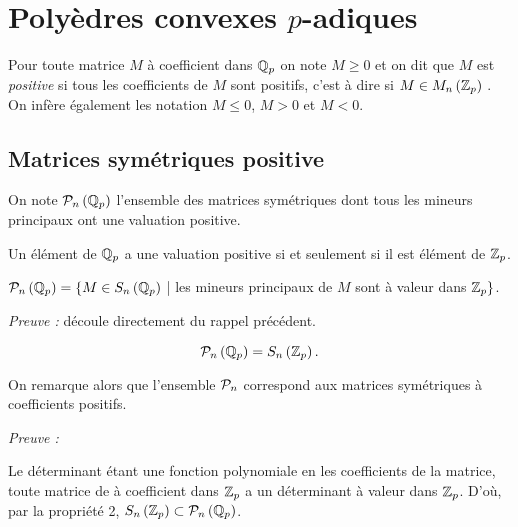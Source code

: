 \section{Polyèdres convexes \texorpdfstring{$p$}{p}-adiques}
\begin{notation}

	Pour toute matrice $M$ à coefficient dans $\Qp$ on note $M\ge 0$ et on dit que $M$ est \textit{positive} si tous les coefficients de $M$  sont positifs, c'est à dire si $M \in M_n\left( \Zp \right) $ . On infère également les notation $M\le 0$, $M>0$ et $M<0$.     
\end{notation}

\subsection{Matrices symétriques positive} 

\begin{definition}
	On note $\P_n\left( \Qp \right) $ l'ensemble des matrices symétriques dont tous les mineurs principaux ont une valuation positive.
\end{definition} 

\begin{rappel}
	
Un élément de $ \Qp$ a une valuation positive si et seulement si il est élément de $\Zp$. 
\end{rappel}

\begin{propriete}
	
	$\P_n\left( \Qp \right) = \{ M \in S_n\left( \Qp \right)$ | les\- min\-eurs\- prin\-ci\-paux\- de\- $M$ \-sont \-à \-va\-leur \-dans\- $\Zp \} $.
\end{propriete}

	\textit{Preuve :} découle directement du rappel précédent. 
	\medskip


\begin{prop}
	 \[
		 \Pn = S_n\left( \Zp \right) 
	.\]  
\end{prop}

\begin{remarque}
	On remarque alors que l'ensemble $\P_n$ correspond aux matrices symétriques à coefficients positifs.   
\end{remarque}
	\textit{Preuve :}

 Le déterminant étant une fonction polynomiale en les coefficients de la matrice, toute matrice de à coefficient dans $\Zp$ a un déterminant à valeur dans $\Zp$. D'où, par la propriété 2, $S_n\left( \Zp \right) \subset \Pn $.

